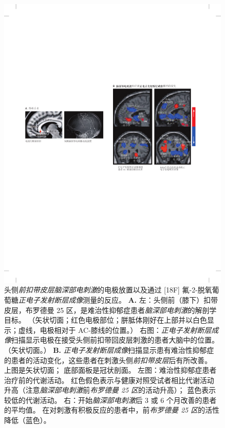 \begin{figure}[htbp]
	\centering
	\includegraphics[width=1.0\linewidth]{chap61/fig_61_8}
	\caption{头侧\textit{前扣带皮层}\textit{脑深部电刺激}的电极放置以及通过 [18F] 氟-2-脱氧葡萄糖\textit{正电子发射断层成像}测量的反应。
		\textbf{A.} 左：头侧前（膝下）扣带皮层，布罗德曼 25 区，是难治性抑郁症患者\textit{脑深部电刺激}的解剖学目标。
		（矢状切面；红色电极部位；胼胝体刚好在上部并以白色显示；虚线，电极相对于 AC-膝线的位置。）
		右图：\textit{正电子发射断层成像}扫描显示电极在接受头侧前扣带回皮层刺激的患者大脑中的位置。 （矢状切面。）
		\textbf{B.} \textit{正电子发射断层成像}扫描显示患有难治性抑郁症的患者的活动变化，这些患者在刺激头侧\textit{前扣带皮层}后有所改善。
		上图是矢状切面；
		底部面板是冠状剖面。
		左图：难治性抑郁症患者治疗前的代谢活动。 红色假色表示与健康对照受试者相比代谢活动升高（注意\textit{脑深部电刺激}前\textit{布罗德曼 25 区}的活动升高）； 蓝色表示较低的代谢活动。
		右：开始\textit{脑深部电刺激}后 3 或 6 个月改善的患者的平均值。
		在对刺激有积极反应的患者中，前\textit{布罗德曼 25 区}的活性降低（蓝色）。}
	\label{fig:61_8}
\end{figure}



